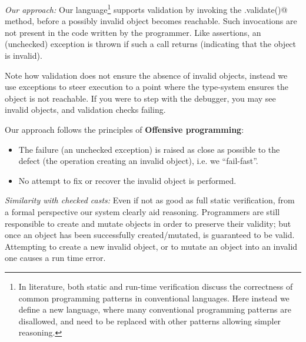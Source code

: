 \loseSpace
\noindent\textit{Our approach:}
Our language\footnote{
In literature, both static and run-time verification discuss
the correctness of common programming patterns in conventional languages. Here instead we define a new language, where
many conventional programming patterns are disallowed,
and need to be replaced with other patterns allowing simpler reasoning.
} supports validation by invoking the \Q@.validate()@ method, before a possibly invalid object becomes reachable. Such invocations are not present in the code written by the programmer. 
Like assertions, an (unchecked) exception is thrown if such a call returns \Q@false@ (indicating that the object is invalid).

Note how validation does not ensure the absence of invalid objects, instead we use exceptions to steer execution to a point where the type-system ensures the object is not reachable.
If you were to step with the debugger, you may see invalid objects, and validation checks failing.

\noindent Our approach follows the principles of \textbf{Offensive programming}:
\begin{itemize}
\item The failure (an unchecked exception)
is raised as close as possible to the defect (the operation creating an invalid object), i.e. we ``fail-fast''.
\item No attempt to fix or recover the invalid object is performed.
\end{itemize}


%
\noindent\textit{Similarity with checked casts:}%
 Even if not as good as full static verification, from a formal perspective
 our system clearly aid reasoning.
Programmers are still responsible to create and mutate objects in order to preserve their validity;
but once an object has been successfully created/mutated, is guaranteed to be valid.
Attempting to create a new invalid object, or to mutate an object into an invalid one causes
a run time error.


